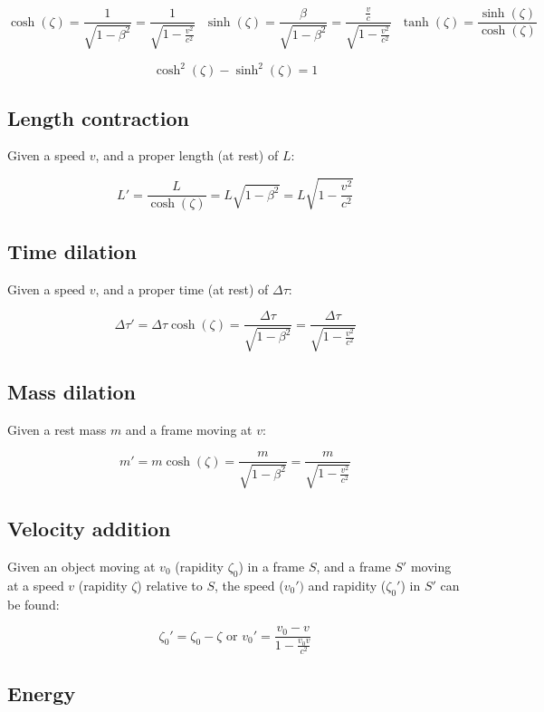 \documentclass[12pt]{article}
\begin{document}
\[
\boxed{
\cosh(\zeta) = \frac{1}{\sqrt{1 - \beta^2}} = \frac{1}{\sqrt{1-\frac{v^2}{c^2}}}
}\text{ }
\boxed{
\sinh(\zeta) = \frac{\beta}{\sqrt{1 - \beta^2}} = \frac{\frac{v}{c}}{\sqrt{1-\frac{v^2}{c^2}}}
}\text{ }
\boxed{
\tanh(\zeta) = \frac{\sinh(\zeta)}{\cosh(\zeta)}
}
\]

\[
\boxed{
\cosh^2(\zeta) - \sinh^2(\zeta) = 1
}
\]

\subsection{Length contraction}

Given a speed $v$, and a proper length (at rest) of $L$:

\[
\boxed{
L'=\frac{L}{\cosh(\zeta)}=L\sqrt{1 - \beta^2} = L\sqrt{1 - \frac{v^2}{c^2}}
}
\]

\subsection{Time dilation}

Given a speed $v$, and a proper time (at rest) of $\Delta\tau$:

\[
\boxed{
\Delta\tau' = \Delta\tau\cosh(\zeta) = \frac{\Delta\tau}{\sqrt{1 - \beta^2}} = \frac{\Delta\tau}{\sqrt{1 - \frac{v^2}{c^2}}}
}
\]

\subsection{Mass dilation}

Given a rest mass $m$ and a frame moving at $v$:

\[
\boxed{
m' = m\cosh(\zeta) = \frac{m}{\sqrt{1 - \beta^2}} = \frac{m}{\sqrt{1 - \frac{v^2}{c^2}}}
}
\]

\subsection{Velocity addition}

Given an object moving at $v_0$ (rapidity $\zeta_0$) in a frame $S$, and a frame $S'$ moving at a speed $v$ (rapidity $\zeta$) relative to $S$, the speed ($v_0')$ and rapidity ($\zeta_0'$) in $S'$ can be found:

\[
\boxed{
\zeta_0' = \zeta_0 - \zeta
} \text{ or } 
\boxed{
v_0' = \frac{v_0 - v}{1 - \frac{v_0 v}{c^2}}
}
\]

\newpage

\subsection{Energy}
\end{document}
